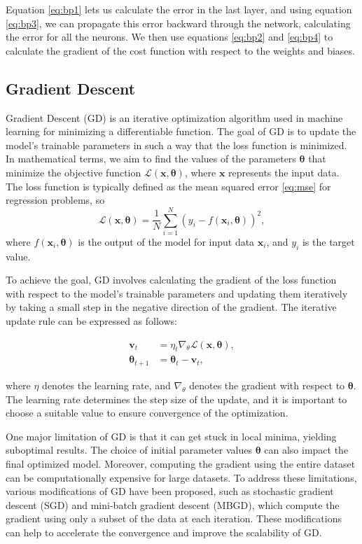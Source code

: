 Equation \eqref{eq:bp1} lets us calculate the error in the last layer, and using equation \eqref{eq:bp3}, we can propagate this error backward through the network, calculating the error for all the neurons.
We then use equations \eqref{eq:bp2} and \eqref{eq:bp4} to calculate the gradient of the cost function with respect to the weights and biases.


\subsection{Gradient Descent}
Gradient Descent (GD) is an iterative optimization algorithm used in machine learning for minimizing a differentiable function.
The goal of GD is to update the model's trainable parameters in such a way that the loss function is minimized.
In mathematical terms, we aim to find the values of the parameters $\boldsymbol{\theta}$ that minimize the objective function $\mathcal{L}(\mathbf{x}, \boldsymbol{\theta})$, where $\mathbf{x}$ represents the input data.
The loss function is typically defined as the mean squared error \eqref{eq:mse} for regression problems, so
\begin{equation}
    \mathcal{L}(\mathbf{x}, \boldsymbol{\theta}) = \frac{1}{N}\sum_{i=1}^N(y_i-f(\mathbf{x}_i, \boldsymbol{\theta}))^2,
\end{equation}
where $f(\mathbf{x}_i, \boldsymbol{\theta})$ is the output of the model for input data $\mathbf{x}_i$, and $y_i$ is the target value.

To achieve the goal, GD involves calculating the gradient of the loss function with respect to the model's trainable parameters and updating them iteratively by taking a small step in the negative direction of the gradient.
The iterative update rule can be expressed as follows:

\begin{align}
\mathbf{v}_t &= \eta_t \nabla_\theta \mathcal{L}(\mathbf{x}, \boldsymbol{\theta}), \\
\boldsymbol{\theta}_{t+1} &= \boldsymbol{\theta}_t - \mathbf{v}_t,
\end{align}

where $\eta$ denotes the learning rate, and $\nabla_\theta$ denotes the gradient with respect to $\boldsymbol{\theta}$.
The learning rate determines the step size of the update, and it is important to choose a suitable value to ensure convergence of the optimization.

One major limitation of GD is that it can get stuck in local minima, yielding suboptimal results.
The choice of initial parameter values $\boldsymbol{\theta}$ can also impact the final optimized model.
Moreover, computing the gradient using the entire dataset can be computationally expensive for large datasets.
To address these limitations, various modifications of GD have been proposed,
such as stochastic gradient descent (SGD) and mini-batch gradient descent (MBGD),
which compute the gradient using only a subset of the data at each iteration.
These modifications can help to accelerate the convergence and improve the scalability of GD.

